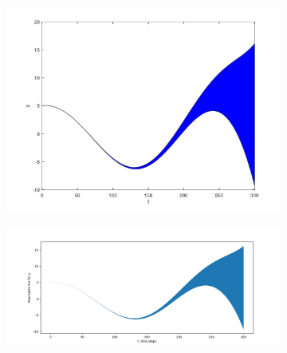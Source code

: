 \documentclass[EPiC]{easychair}
\begin{document}
\begin{figure}[h]
    \begin{subfigure}{0.5\textwidth}
    \centering
    \includegraphics[width=\textwidth]{SapoFigures/Rosslert/SapoRosslerY.jpg}
    \end{subfigure}
    \begin{subfigure}{0.65\textwidth}
    \centering
    \includegraphics[width=\textwidth]{SapoFigures/Rosslert/KaaRosslerY.png}
    \end{subfigure}
    

\end{figure}
\end{document}
